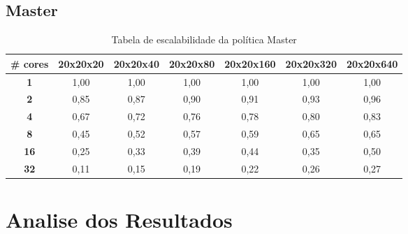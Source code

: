 \documentclass[a4paper, 12pt]{article}
\begin{document}
	\FloatBarrier
	
	\subsection{Master}
	\begin{table}[htbp]
		\centering
		\begin{tabular}{|c|c|c|c|c|c|c|}
			\hline
			\textbf{\# cores} & \textbf{20x20x20} & \textbf{20x20x40} & \textbf{20x20x80} & \textbf{20x20x160} & \textbf{20x20x320} & \textbf{20x20x640} \\
			\hline
			\textbf{1} & 1,00 & 1,00 & 1,00 & 1,00 & 1,00 & 1,00 \\
			\hline
			\textbf{2} & 0,85 & 0,87 & 0,90 & 0,91 & 0,93 & 0,96 \\
			\hline
			\textbf{4} & 0,67 & 0,72 & 0,76 & 0,78 & 0,80 & 0,83 \\
			\hline
			\textbf{8} & 0,45 & 0,52 & 0,57 & 0,59 & 0,65 & 0,65 \\
			\hline
			\textbf{16} & 0,25 & 0,33 & 0,39 & 0,44 & 0,35 & 0,50 \\
			\hline
			\textbf{32} & 0,11 & 0,15 & 0,19 & 0,22 & 0,26 & 0,27 \\
			\hline
		\end{tabular}
		\caption{Tabela de escalabilidade da política Master}
	\end{table}
	
	\FloatBarrier
	
	\section{Analise dos Resultados}
	

	
	
	

	 
\end{document}
